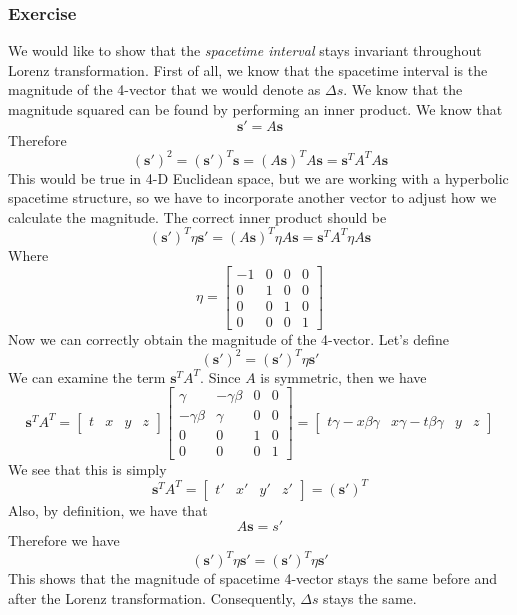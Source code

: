 \documentclass[12pt]{article}
\newcommand{\paren}[1]{\left( #1 \right)}
\begin{document}
\subsubsection{Exercise}
We would like to show that the \textit{spacetime interval} stays invariant throughout Lorenz transformation. First of all, we know that the spacetime interval is the magnitude of the 4-vector that we would denote as $\Delta s$. We know that the magnitude squared can be found by performing an inner product. We know that
\[
\mathbf{s'} = A\mathbf{s}
\]
Therefore
\[
(\mathbf{s}')^2 = \paren{\mathbf{s}'}^T\mathbf{s} = \paren{A\mathbf{s}}^TA\mathbf{s} = \mathbf{s}^TA^TA\mathbf{s}
\]
This would be true in 4-D Euclidean space, but we are working with a hyperbolic spacetime structure, so we have to incorporate another vector to adjust how we calculate the magnitude. The correct inner product should be
\[
\paren{\mathbf{s}'}^T\eta\mathbf{s}' = \paren{A\mathbf{s}}^T\eta A\mathbf{s} = \mathbf{s}^TA^T\eta A\mathbf{s}
\]
Where 
\[
\eta = \begin{bmatrix}
    -1&0&0&0\\
    0&1&0&0\\
    0&0&1&0\\
    0&0&0&1
\end{bmatrix}
\]
Now we can correctly obtain the magnitude of the 4-vector. Let's define
\[
\paren{\mathbf{s}'}^2 = \paren{\mathbf{s}'}^T\eta\mathbf{s}'
\]
We can examine the term $\mathbf{s}^TA^T$. Since $A$ is symmetric, then we have 
\[
\mathbf{s}^TA^T = \begin{bmatrix}
    t&x&y&z
\end{bmatrix}\begin{bmatrix}
\gamma & -\gamma\beta & 0 & 0 \\
-\gamma\beta & \gamma & 0 & 0 \\
0 & 0 & 1 & 0 \\
0 & 0 & 0 & 1
\end{bmatrix} = \left[\begin{matrix}
t\gamma-x\beta\gamma & x\gamma-t\beta\gamma & y & z
\end{matrix}\right]
\]
We see that this is simply
\[
\mathbf{s}^TA^T = \left[\begin{matrix}
t' & x' & y' & z'
\end{matrix}\right] = \paren{\mathbf{s}'}^T
\]
Also, by definition, we have that
\[
A\mathbf{s} = s'
\]
Therefore we have
\[
\paren{\mathbf{s}'}^T\eta\mathbf{s}' = \paren{\mathbf{s}'}^T\eta\mathbf{s}'
\]
This shows that the magnitude of spacetime 4-vector stays the same before and after the Lorenz transformation. Consequently, $\Delta s$ stays the same. 
\end{document}

